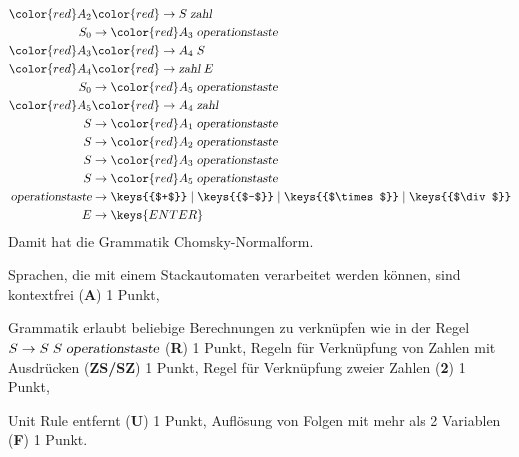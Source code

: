 \begin{loesung}
\begin{teilaufgaben}
\begin{align*}
\color{red}A_2&\color{red}\rightarrow S \; \textsl{zahl}
\\
S_0&\rightarrow {\color{red}A_3} \; \textsl{operationstaste}
\\
\color{red}A_3&\color{red}\rightarrow A_4 \; S
\\
\color{red}A_4&\color{red}\rightarrow \textsl{zahl} \; E
\\
S_0&\rightarrow {\color{red}A_5} \; \textsl{operationstaste}
\\
\color{red}A_5&\color{red}\rightarrow A_4 \; \textsl{zahl}
\\
S&\rightarrow {\color{red}A_1} \; \textsl{operationstaste}
\\
S&\rightarrow {\color{red}A_2} \; \textsl{operationstaste}
\\
S&\rightarrow {\color{red}A_3} \;\textsl{operationstaste}
\\
S&\rightarrow {\color{red}A_5} \; \textsl{operationstaste}
\\
\textsl{operationstaste}&\rightarrow
\keys{{$+$}}
\mid 
\keys{{$-$}}
\mid 
\keys{{$\times$}}
\mid 
\keys{{$\div$}}
\\
E&\rightarrow\keys{ENTER}
\end{align*}
Damit hat die Grammatik Chomsky-Normalform.
\qedhere
\end{teilaufgaben}
\end{loesung}

\begin{bewertung}
\begin{teilaufgaben}
\item
Sprachen, die mit einem Stackautomaten verarbeitet werden können, sind
kontextfrei ({\bf A}) 1 Punkt,
\item
Grammatik erlaubt beliebige Berechnungen zu verknüpfen wie in der
Regel $S\to S\;S\;\textsl{operationstaste}$ ({\bf R}) 1 Punkt,
Regeln für Verknüpfung von Zahlen mit Ausdrücken ({\bf ZS/SZ}) 1 Punkt,
Regel für Verknüpfung zweier Zahlen ({\bf 2}) 1 Punkt,
\item
Unit Rule entfernt ({\bf U}) 1 Punkt, Auflösung von Folgen mit mehr
als 2 Variablen ({\bf F}) 1 Punkt.
\end{teilaufgaben}
\end{bewertung}


